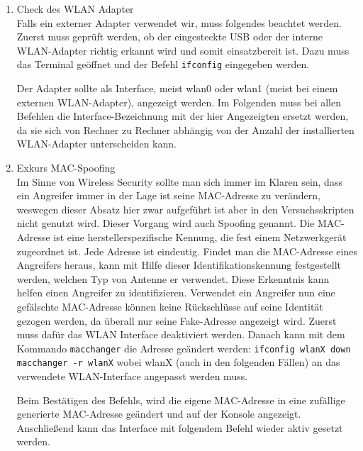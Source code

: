 \begin{enumerate}
	\item {Check des WLAN Adapter} \\
	Falls ein externer Adapter verwendet wir, muss folgendes beachtet werden. Zuerst muss geprüft werden, ob der eingesteckte USB oder der interne WLAN-Adapter richtig erkannt wird und somit einsatzbereit ist. Dazu muss das Terminal geöffnet und der Befehl \colorbox{altgray}{\lstinline|ifconfig|} eingegeben werden.

	Der Adapter sollte als Interface, meist wlan0 oder wlan1 (meist bei einem externen WLAN-Adapter), angezeigt werden. Im Folgenden muss bei allen Befehlen die Interface-Bezeichnung mit der hier Angezeigten ersetzt werden, da sie sich von Rechner zu Rechner abhängig von der Anzahl der installierten WLAN-Adapter unterscheiden kann.

	\item {Exkurs MAC-Spoofing} \\
Im Sinne von Wireless Security sollte man sich immer im Klaren sein, dass ein Angreifer immer in der Lage ist seine MAC-Adresse zu verändern, weswegen dieser Absatz hier zwar aufgeführt ist aber in den Versuchsskripten nicht genutzt wird. Dieser Vorgang wird auch Spoofing genannt. Die MAC-Adresse ist eine herstellerspezifische Kennung, die fest einem Netzwerkgerät zugeordnet ist. Jede Adresse ist eindeutig. Findet man die MAC-Adresse eines Angreifers heraus, kann mit Hilfe dieser Identifikationskennung festgestellt werden, welchen Typ von Antenne er verwendet. Diese Erkenntnis kann helfen einen Angreifer zu identifizieren. Verwendet ein Angreifer nun eine gefälschte MAC-Adresse können keine Rückschlüsse auf seine Identität gezogen werden, da überall nur seine Fake-Adresse angezeigt wird. Zuerst muss dafür das WLAN Interface deaktiviert werden. Danach kann mit dem Kommando \colorbox{altgray}{\lstinline|macchanger|} die Adresse geändert werden:\newline
	\newline
	\colorbox{altgray}{\lstinline|ifconfig wlanX down|}\newline
	\newline
	\colorbox{altgray}{\lstinline|macchanger -r wlanX|}\newline
	\newline
	wobei wlanX (auch in den folgenden Fällen) an das verwendete WLAN-Interface angepasst werden muss.\newline

	Beim Bestätigen des Befehls, wird die eigene MAC-Adresse in eine zufällige generierte MAC-Adresse geändert und auf der Konsole angezeigt. Anschließend kann das Interface mit folgendem Befehl wieder aktiv gesetzt werden.


\end{enumerate}
